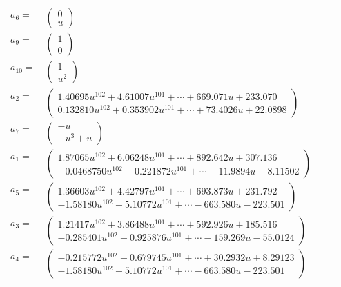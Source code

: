 \documentclass[1p]{elsarticle_modified}
\theoremstyle{definition}
\begin{document}
\begin{tabular}{m{7pt} m{180pt} m{7pt} m{180pt} }
\flushright $a_{6}=$&$\begin{pmatrix}0\\u\end{pmatrix}$ \\
\flushright $a_{9}=$&$\begin{pmatrix}1\\0\end{pmatrix}$ \\
\flushright $a_{10}=$&$\begin{pmatrix}1\\u^2\end{pmatrix}$ \\
\flushright $a_{2}=$&$\begin{pmatrix}1.40695 u^{102}+4.61007 u^{101}+\cdots+669.071 u+233.070\\0.132810 u^{102}+0.353902 u^{101}+\cdots+73.4026 u+22.0898\end{pmatrix}$ \\
\flushright $a_{7}=$&$\begin{pmatrix}- u\\- u^3+u\end{pmatrix}$ \\
\flushright $a_{1}=$&$\begin{pmatrix}1.87065 u^{102}+6.06248 u^{101}+\cdots+892.642 u+307.136\\-0.0468750 u^{102}-0.221872 u^{101}+\cdots-11.9894 u-8.11502\end{pmatrix}$ \\
\flushright $a_{5}=$&$\begin{pmatrix}1.36603 u^{102}+4.42797 u^{101}+\cdots+693.873 u+231.792\\-1.58180 u^{102}-5.10772 u^{101}+\cdots-663.580 u-223.501\end{pmatrix}$ \\
\flushright $a_{3}=$&$\begin{pmatrix}1.21417 u^{102}+3.86488 u^{101}+\cdots+592.926 u+185.516\\-0.285401 u^{102}-0.925876 u^{101}+\cdots-159.269 u-55.0124\end{pmatrix}$ \\
\flushright $a_{4}=$&$\begin{pmatrix}-0.215772 u^{102}-0.679745 u^{101}+\cdots+30.2932 u+8.29123\\-1.58180 u^{102}-5.10772 u^{101}+\cdots-663.580 u-223.501\end{pmatrix}$ \\

\end{tabular}
\end{document}
